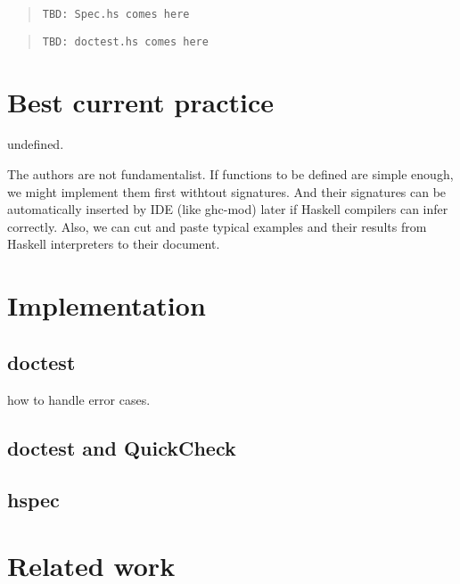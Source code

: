 \documentclass[preprint]{sigplanconf}
\begin{document}
\begin{quote}
\begin{verbatim}
TBD: Spec.hs comes here
\end{verbatim}
\end{quote}

\begin{quote}
\begin{verbatim}
TBD: doctest.hs comes here
\end{verbatim}
\end{quote}


\section{Best current practice}

undefined.

The authors are not fundamentalist.
If functions to be defined are simple enough,
we might implement them first withtout signatures.
And their signatures can be automatically
inserted by IDE (like ghc-mod) later
if Haskell compilers can infer correctly.
Also, we can cut and paste typical examples and their results
from Haskell interpreters to their document.

\section{Implementation}

\subsection{doctest}

how to handle error cases.

\subsection{doctest and QuickCheck}

\subsection{hspec}

\section{Related work}
\end{document}

